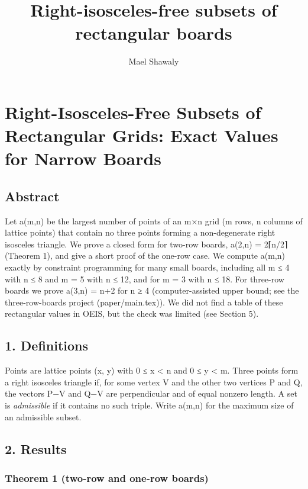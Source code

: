 \documentclass[
  11pt,
]{article}
\title{Right-isosceles-free subsets of rectangular boards}
\author{Mael Shawaly}
\date{}
\begin{document}
\maketitle

\section{Right-Isosceles-Free Subsets of Rectangular Grids: Exact Values
for Narrow
Boards}\label{right-isosceles-free-subsets-of-rectangular-grids-exact-values-for-narrow-boards}

\subsection{Abstract}\label{abstract}

Let a(m,n) be the largest number of points of an m×n grid (m rows, n
columns of lattice points) that contain no three points forming a
non-degenerate right isosceles triangle. We prove a closed form for
two-row boards, a(2,n) = 2⌈n/2⌉ (Theorem 1), and give a short proof of
the one-row case. We compute a(m,n) exactly by constraint programming
for many small boards, including all m ≤ 4 with n ≤ 8 and m = 5 with n ≤
12, and for m = 3 with n ≤ 18. For three-row boards we prove a(3,n) =
n+2 for n ≥ 4 (computer-assisted upper bound; see the three-row-boards
project (paper/main.tex)). We did not find a table of these rectangular
values in OEIS, but the check was limited (see Section 5).

\subsection{1. Definitions}\label{definitions}

Points are lattice points (x, y) with 0 ≤ x \textless{} n and 0 ≤ y
\textless{} m. Three points form a right isosceles triangle if, for some
vertex V and the other two vertices P and Q, the vectors P−V and Q−V are
perpendicular and of equal nonzero length. A set is \emph{admissible} if
it contains no such triple. Write a(m,n) for the maximum size of an
admissible subset.

\subsection{2. Results}\label{results}

\subsubsection{Theorem 1 (two-row and one-row
boards)}\label{theorem-1-two-row-and-one-row-boards}
\end{document}
